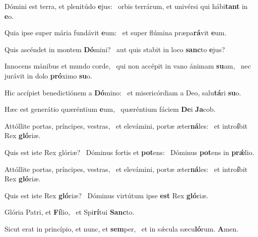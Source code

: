 \item Dómini est terra, et plenitúdo \textbf{e}jus:~\psstar{} orbis terrárum, et univérsi qui hábi\textbf{tant} in \textbf{e}o.
\item Quia ipse super mária fundávit \textbf{e}um:~\psstar{} et super flúmina præpa\textbf{rá}vit \textbf{e}um.
\item Quis ascéndet in montem \textbf{Dó}mini?~\psstar{} aut quis stabit in loco \textbf{sanc}to \textbf{e}jus?
\item Innocens mánibus et mundo corde,~\pscross{} qui non accépit in vano ánimam \textbf{su}am,~\psstar{} nec jurávit in dolo \textbf{pró}ximo \textbf{su}o.
\item Hic accípiet benedictiónem a \textbf{Dó}mino:~\psstar{} et misericórdiam a Deo, salu\textbf{tá}ri \textbf{su}o.
\item Hæc est generátio quæréntium \textbf{e}um,~\psstar{} quæréntium fáciem \textbf{De}i \textbf{Ja}cob.
\item Attóllite portas, príncipes, vestras,~\pscross{} et elevámini, portæ æter\textbf{ná}les:~\psstar{} et intro\textbf{í}bit Rex \textbf{gló}riæ.
\item Quis est iste Rex glóriæ?~\pscross{} Dóminus fortis et \textbf{pot}ens:~\psstar{} Dóminus \textbf{pot}ens in \textbf{prǽ}lio.
\item Attóllite portas, príncipes, vestras,~\pscross{} et elevámini, portæ æter\textbf{ná}les:~\psstar{} et intro\textbf{í}bit Rex \textbf{gló}riæ.
\item Quis est iste Rex \textbf{gló}riæ?~\psstar{} Dóminus virtútum ipse \textbf{est} Rex \textbf{gló}riæ.
\item Glória Patri, et \textbf{Fí}lio,~\psstar{} et Spi\textbf{rí}tui \textbf{Sanc}to.
\item Sicut erat in princípio, et nunc, et \textbf{sem}per,~\psstar{} et in sǽcula sæcu\textbf{ló}rum. \textbf{A}men.
